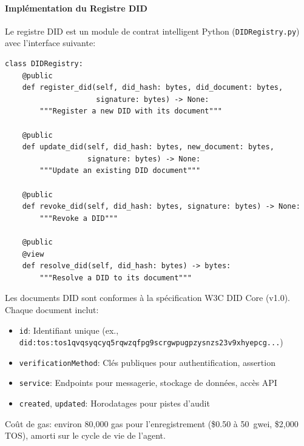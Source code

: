 \documentclass[11pt]{article}
\begin{document}
\paragraph{Implémentation du Registre DID} Le registre DID est un module de contrat intelligent Python (\texttt{DIDRegistry.py}) avec l'interface suivante:
\begin{verbatim}
class DIDRegistry:
    @public
    def register_did(self, did_hash: bytes, did_document: bytes,
                     signature: bytes) -> None:
        """Register a new DID with its document"""

    @public
    def update_did(self, did_hash: bytes, new_document: bytes,
                   signature: bytes) -> None:
        """Update an existing DID document"""

    @public
    def revoke_did(self, did_hash: bytes, signature: bytes) -> None:
        """Revoke a DID"""

    @public
    @view
    def resolve_did(self, did_hash: bytes) -> bytes:
        """Resolve a DID to its document"""
\end{verbatim}
Les documents DID sont conformes à la spécification W3C DID Core (v1.0). Chaque document inclut:
\begin{itemize}[noitemsep]
  \item \texttt{id}: Identifiant unique (ex., \texttt{did:tos:tos1qvqsyqcyq5rqwzqfpg9scrgwpugpzysnzs23v9xhyepcg...})
  \item \texttt{verificationMethod}: Clés publiques pour authentification, assertion
  \item \texttt{service}: Endpoints pour messagerie, stockage de données, accès API
  \item \texttt{created}, \texttt{updated}: Horodatages pour pistes d'audit
\end{itemize}
Coût de gas: environ 80,000 gas pour l'enregistrement (\$0.50 à 50~gwei, \$2,000 TOS), amorti sur le cycle de vie de l'agent.
\end{document}
